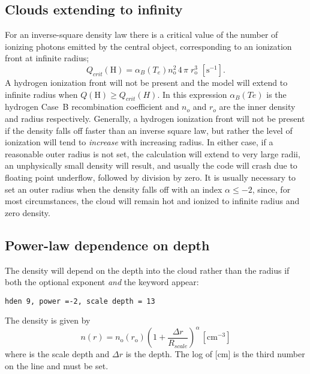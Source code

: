 \subsection{Clouds extending to infinity}

For an inverse-square density law there is a critical value of the number
of ionizing photons emitted by the central object, corresponding to an
ionization front at infinite radius;
\begin{equation}
Q_{crit} \left( {\mathrm{H}} \right) = \alpha _B \left( {T_e }
\right)n_{\mathrm{o}}^2 \,4\,\pi \;r_{\mathrm{o}}^{\mathrm{3}}
\,\, [\mathrm{s}^{-1}] .
\end{equation}
A hydrogen ionization front will not be present and the model will extend
to infinite radius when $Q(\mathrm{H}) \ge Q_{crit}(H)$.
In this expression
$\alpha_B(Te)$ is the
hydrogen Case~B recombination coefficient
and $n_o$ and $r_o$ are the inner density
and radius respectively.
Generally, a hydrogen ionization front will not
be present if the density falls off faster than an inverse square law,
but
rather the level of ionization will tend to \emph{increase}
with increasing radius.
In either case, if a reasonable outer radius is not set, the calculation
will extend to very large radii,
an unphysically small density will result,
and usually the code will crash due to floating point underflow,
followed by division by zero.
It is usually necessary to set an outer radius when
the density falls off with an index $\alpha \le -2$,
since, for most circumstances,
the cloud will remain hot and ionized to infinite radius and zero density.

\subsection{Power-law dependence on depth}

The density will depend on the depth into the cloud rather than the radius
if both the optional exponent \emph{and} the keyword  appear:
\begin{verbatim}
hden 9, power =-2, scale depth = 13
\end{verbatim}
The density is given by
\begin{equation}
n\left( r \right) = n_{\mathrm{o}} \left( {r_{\mathrm{o}} } \right)\left( {1 +
\frac{{\Delta r}}{{R_{scale} }}} \right)^\alpha  \, [\mathrm{cm}^{-3}]%
\end{equation}
where  is the scale depth and $\Delta r$ is the depth.
The log of  [cm] is the
third number on the line and must be set.

